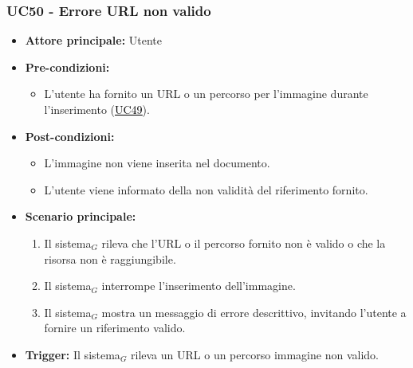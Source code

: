 \documentclass[a4paper, 10pt]{article}
\newcommand{\uclink}[2]{\hyperlink{#1}{\textcolor{black}{\underline{#2}}}}
\begin{document}
\subsubsection{UC50 - Errore URL non valido}
\hypertarget{uc:50}{}
\begin{itemize}
    \item \textbf{Attore principale:} Utente
    \item \textbf{Pre-condizioni:}
        \begin{itemize}
            \item L'utente ha fornito un URL o un percorso per l'immagine durante l'inserimento (\uclink{uc:49}{UC49}).
        \end{itemize}
    \item \textbf{Post-condizioni:}
        \begin{itemize}
            \item L'immagine non viene inserita nel documento.
            \item L'utente viene informato della non validità del riferimento fornito.
        \end{itemize}
    \item \textbf{Scenario principale:}
        \begin{enumerate}
            \item Il sistema$_G$ rileva che l'URL o il percorso fornito non è valido o che la risorsa non è raggiungibile.
            \item Il sistema$_G$ interrompe l'inserimento dell'immagine.
            \item Il sistema$_G$ mostra un messaggio di errore descrittivo, invitando l'utente a fornire un riferimento valido.
        \end{enumerate}
    \item \textbf{Trigger:} Il sistema$_G$ rileva un URL o un percorso immagine non valido.
\end{itemize}


\hypertarget{uc:51}{}
\end{document}
